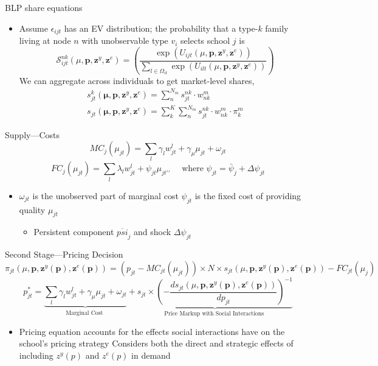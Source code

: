 \documentclass[dvipsnames]{beamer}
\begin{document}
\begin{frame}{BLP share equations}
  \begin{itemize}
  \item Assume $\epsilon_{ijt}$ has an EV distribution; the probability that a type-$k$ family living at node $n$ with unobservable type $v_i$ selects school $j$ is
    \[
\mathcal{S}_{i j t}^{n k}\left(\mu, \mathbf{p}, \mathbf{z}^{y}, \mathbf{z}^{e}\right)=\left(\frac{\exp \left(U_{i j t}\left(\mu, \mathbf{p}, \mathbf{z}^{y}, \mathbf{z}^{e}\right)\right)}{\sum_{l \in \Omega_{i t}} \exp \left(U_{i l t}\left(\mu, \mathbf{p}, \mathbf{z}^{y}, \mathbf{z}^{e}\right)\right)}\right)
    \]
    \vitem We can aggregate across individuals to get market-level shares,
    \[
\begin{gathered}
s_{j t}^{k}\left(\boldsymbol{\mu}, \mathbf{p}, \mathbf{z}^{y}, \mathbf{z}^{e}\right)=\sum_{n}^{N_{m}} s_{j t}^{n k} \cdot w_{n k}^{m} \\
s_{j t}\left(\boldsymbol{\mu}, \mathbf{p}, \mathbf{z}^{y}, \mathbf{z}^{e}\right)=\sum_{k}^{K} \sum_{n}^{N_{m}} s_{j t}^{n k} \cdot w_{n k}^{m} \cdot \pi_{k}^{m}
\end{gathered}
    \]    
  \end{itemize}
\end{frame}
%
\begin{frame}{Supply---Costs}
  \[
M C_{j}\left(\mu_{j t}\right)=\sum_{l} \gamma_{l} w_{j t}^{l}+\gamma_{\mu} \mu_{j t}+\omega_{j t}
  \]
  \[
F C_{j}\left(\mu_{j t}\right)=\sum_{l} \lambda_{l} w_{j t}^{l}+\psi_{j t} \mu_{j t \prime \prime} \quad \text { where } \psi_{j t}=\bar{\psi}_{j}+\Delta \psi_{j t}
  \]
  \begin{itemize}
  \item $\omega_{jt}$ is the unobserved part of marginal cost
    \vitem $\psi_{jt}$ is the fixed cost of providing quality $\mu_{jt}$
    \begin{itemize}
     \item Persistent component $\overline{psi}_j$ and shock $\Delta \psi_{jt}$ 
    \end{itemize}
  \end{itemize}
\end{frame}
%
\begin{frame}{Second Stage---Pricing Decision}
  \[
\pi_{j t}\left(\mu, \mathbf{p}, \mathbf{z}^{y}(\mathbf{p}), \mathbf{z}^{e}(\mathbf{p})\right)=\left(p_{j t}-M C_{j t}\left(\mu_{j t}\right)\right) \times N \times s_{j t}\left(\mu, \mathbf{p}, \mathbf{z}^{y}(\mathbf{p}), \mathbf{z}^{e}(\mathbf{p})\right)-F C_{j t}\left(\mu_{j}\right)
  \]  
  \[
p_{j t}^{*}=\underbrace{\sum_{l} \gamma_{l} w_{j t}^{l}+\gamma_{\mu} \mu_{j t}+\omega_{j t}}_{\text {Marginal Cost }}+\underbrace{s_{j t} \times\left(-\frac{d s_{j t}\left(\mu, \mathbf{p}, \mathbf{z}^{y}(\mathbf{p}), \mathbf{z}^{e}(\mathbf{p})\right)}{d p_{j t}}\right)^{-1}}_{\text {Price Markup with Social Interactions }}
  \]
  \begin{itemize}
  \item Pricing equation accounts for the effects social interactions have on the school's pricing strategy
    \vitem Considers both the direct and strategic effects of including $z^y(p)$ and $z^e(p)$ in demand
  \end{itemize}
\end{frame}
\end{document}
